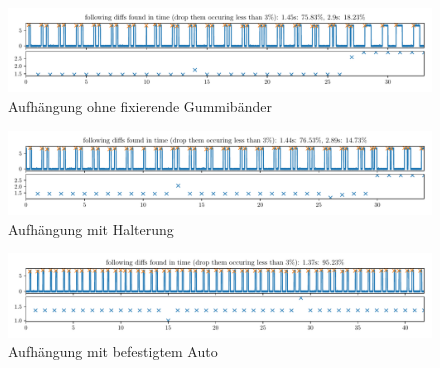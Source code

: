 \documentclass[10pt]{article}
\begin{document}
\begin{figure}[htbp]
    \centering
    \includegraphics[width=\textwidth]{figures/AufhaengungohneGummi.pdf}
    \caption{Aufhängung ohne fixierende Gummibänder}\label{fig:AufhaengungohneGummi}
\end{figure}
\begin{figure}[htbp]
    \centering
    \includegraphics[width=\textwidth]{figures/AufhaengungmitGummi.pdf}
    \caption{Aufhängung mit Halterung}\label{fig:AufhaengungmitGummi}
\end{figure}
\begin{figure}[htbp]
    \centering
    \includegraphics[width=\textwidth]{figures/AufhaengungmitGummiundAuto.pdf}
    \caption{Aufhängung mit befestigtem Auto}\label{fig:AufhaengungmitGummiundAuto}
\end{figure}
\end{document}
